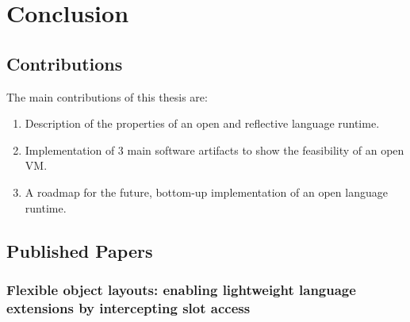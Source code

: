 

\chapter{Conclusion}
\minitoc


\section{Contributions}
The main contributions of this thesis are:
\begin{enumerate}
	\item Description of the properties of an open and reflective language runtime.
	\item Implementation of 3 main software artifacts to show the feasibility of an open VM.
	\item A roadmap for the future, bottom-up implementation of an open language runtime.
\end{enumerate}

\section{Published Papers}
\subsection{Flexible object layouts: enabling lightweight language extensions by intercepting slot access}

